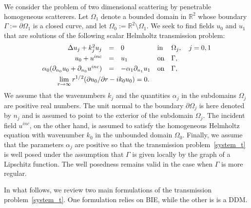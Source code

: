 \documentclass[11pt]{article}
\numberwithin{equation}{section}
\begin{document}
We consider the problem of two dimensional scattering by penetrable homogeneous scatterers. Let $\Omega_1$ denote a bounded domain in $\mathbb{R}^2$ whose boundary $\Gamma:=\partial\Omega_1$ is a closed curve, and let $\Omega_0:=\mathbb{R}^2\setminus\Omega_1$. We seek to find fields $u_0$ and $u_1$ that are solutions of the following scalar Helmholtz transmission problem:
\begin{equation}\label{system_t}
\begin{array}{rclll}
 \Delta u_j +k_j^2 u_j &=&0& {\rm in}& \Omega_j,\quad j=0,1\smallskip\\
  u_0+u^{inc}&=&u_1&{\rm on}& \Gamma,\smallskip\\
  \alpha_0(\partial_{n_0}u_0+\partial_{n_0}u^{inc})&=&-\alpha_1\partial_{n_1}u_1&{\rm on}& \Gamma,\smallskip\\
  \multicolumn{4}{c}{\displaystyle \lim_{r\to\infty}r^{1/2}(\partial u_0/\partial r-ik_0u_0)=0.} \end{array}\end{equation}
We assume that the wavenumbers $k_j$ and the quantities $\alpha_j$ in the subdomains $\Omega_j$ are positive real numbers. The unit normal to the boundary $\partial\Omega_j$ is here denoted by $n_j$ and is assumed to point to the exterior of the subdomain $\Omega_j$. The incident field $u^{inc}$, on the other hand, is assumed to satisfy the homogeneous Helmholtz equation with wavenumber $k_0$ in the unbounded domain $\Omega_0$. Finally, we assume that the parameters $\alpha_j$ are positive so that the transmission problem~\eqref{system_t} is well posed under the assumption that $\Gamma$ is given locally by the graph of a Lipschitz function. The well posedness remains valid in the case when $\Gamma$ is more regular.

In what follows, we review two main formulations of the transmission problem~\eqref{system_t}. One formulation relies on BIE, while the other is is a DDM. 
\end{document}
